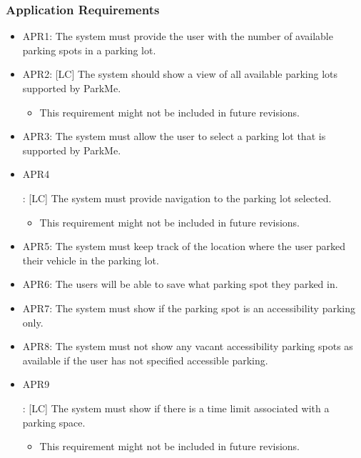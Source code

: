 \documentclass[]{article}
\begin{document}
	\subsubsection{Application Requirements}
	\begin{itemize}
		\item APR1: The system must provide the user with the number of available parking spots in a parking lot.
		
		\item APR2: [LC] The system should show a view of all available parking lots supported by ParkMe.
		\begin{itemize}
			\item This requirement might not be included in future revisions. 
		\end{itemize}
		
		\item APR3: The system must allow the user to select a parking lot that is supported by ParkMe.
	
		\item \hypertarget{APRa}{APR4}: [LC] The system must provide navigation to the parking lot selected.
		\begin{itemize}
			\item This requirement might not be included in future revisions.
		\end{itemize}
		
		\item APR5: The system must keep track of the location where the user parked their vehicle in the parking lot.
		
		\item APR6: The users will be able to save what parking spot they parked in.
		
		\item APR7: The system must show if the parking spot is an accessibility parking only.
		
		\item APR8: The system must not show any vacant accessibility parking spots as available if the user has not specified accessible parking.
		
		\item \hypertarget{APRb}{APR9}: [LC] The system must show if there is a time limit associated with a parking space.
		\begin{itemize}
			\item This requirement might not be included in future revisions.
		\end{itemize}
	

\end{itemize}
\end{document}
